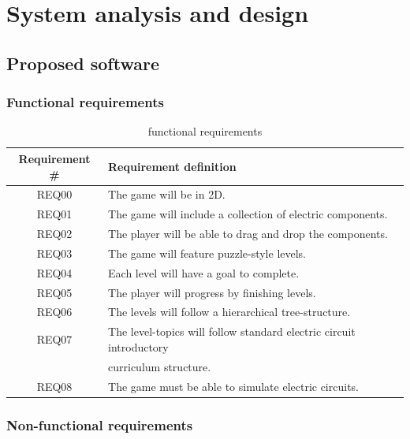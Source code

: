 \documentclass[../main.tex]{subfiles}
\begin{document}
\chapter{System analysis and design}
\section{Proposed software}
\subsection{Functional requirements}

\begin{table}[!ht]
    \caption{functional requirements}  
    \centering
    \begin{tabular}{|c|l|}
       \hline
       Requirement \# & Requirement definition\\
\hline
REQ00 & The game will be in 2D. \\
\hline
REQ01 & The game will include a collection of electric components. \\
\hline
REQ02 & The player will be able to drag and drop the components. \\
\hline
REQ03 & The game will feature puzzle-style levels.\\
\hline
REQ04 & Each level will have a goal to complete. \\
\hline
REQ05 & The player will progress by finishing levels. \\
\hline
REQ06 & The levels will follow a hierarchical tree-structure. \\
\hline
REQ07 & The level-topics will follow standard electric circuit introductory \\
& curriculum structure. \\
\hline
REQ08 & The game must be able to simulate electric circuits. \\
       \hline
       \end{tabular}
    \label{fuctional}
\end{table}

\subsection{Non-functional requirements}
\end{document}
